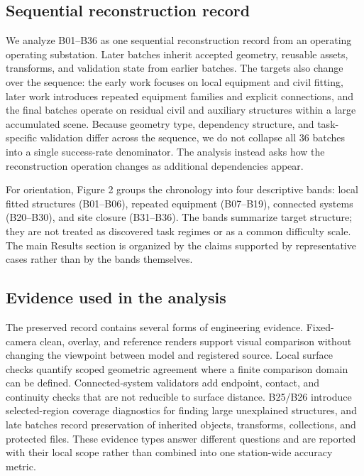 \documentclass[10pt,a4paper]{article}
\begin{document}
\hypertarget{sequential-reconstruction-record}{%
\subsection{Sequential reconstruction
record}\label{sequential-reconstruction-record}}

We analyze B01--B36 as one sequential reconstruction record from an
operating operating substation. Later batches inherit accepted geometry,
reusable assets, transforms, and validation state from earlier batches.
The targets also change over the sequence: the early work focuses on
local equipment and civil fitting, later work introduces repeated
equipment families and explicit connections, and the final batches
operate on residual civil and auxiliary structures within a large
accumulated scene. Because geometry type, dependency structure, and
task-specific validation differ across the sequence, we do not collapse
all 36 batches into a single success-rate denominator. The analysis
instead asks how the reconstruction operation changes as additional
dependencies appear.

For orientation, Figure 2 groups the chronology into four descriptive
bands: local fitted structures (B01--B06), repeated equipment
(B07--B19), connected systems (B20--B30), and site closure (B31--B36).
The bands summarize target structure; they are not treated as discovered
task regimes or as a common difficulty scale. The main Results section
is organized by the claims supported by representative cases rather than
by the bands themselves.

\hypertarget{evidence-used-in-the-analysis}{%
\subsection{Evidence used in the
analysis}\label{evidence-used-in-the-analysis}}

The preserved record contains several forms of engineering evidence.
Fixed-camera clean, overlay, and reference renders support visual
comparison without changing the viewpoint between model and registered
source. Local surface checks quantify scoped geometric agreement where a
finite comparison domain can be defined. Connected-system validators add
endpoint, contact, and continuity checks that are not reducible to
surface distance. B25/B26 introduce selected-region coverage diagnostics
for finding large unexplained structures, and late batches record
preservation of inherited objects, transforms, collections, and
protected files. These evidence types answer different questions and are
reported with their local scope rather than combined into one
station-wide accuracy metric.
\end{document}
